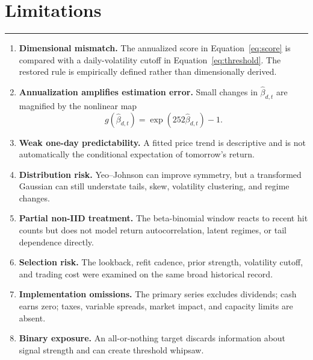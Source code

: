 \documentclass[11pt,a4paper]{article}
\newcommand{\sectionrule}{\vspace{-0.5em}\par\noindent\color{SignalGreen}\rule{\linewidth}{0.7pt}\color{Ink}\par\vspace{0.3em}}
\begin{document}
\section{Limitations}
\sectionrule
\begin{enumerate}
\item \textbf{Dimensional mismatch.} The annualized score in Equation~\ref{eq:score} is compared with a daily-volatility cutoff in Equation~\ref{eq:threshold}. The restored rule is empirically defined rather than dimensionally derived.
\item \textbf{Annualization amplifies estimation error.} Small changes in $\widehat{\beta}_{d,t}$ are magnified by the nonlinear map
\[
g(\widehat{\beta}_{d,t})=\exp(252\widehat{\beta}_{d,t})-1.
\]
\item \textbf{Weak one-day predictability.} A fitted price trend is descriptive and is not automatically the conditional expectation of tomorrow's return.
\item \textbf{Distribution risk.} Yeo--Johnson can improve symmetry, but a transformed Gaussian can still understate tails, skew, volatility clustering, and regime changes.
\item \textbf{Partial non-IID treatment.} The beta-binomial window reacts to recent hit counts but does not model return autocorrelation, latent regimes, or tail dependence directly.
\item \textbf{Selection risk.} The lookback, refit cadence, prior strength, volatility cutoff, and trading cost were examined on the same broad historical record.
\item \textbf{Implementation omissions.} The primary series excludes dividends; cash earns zero; taxes, variable spreads, market impact, and capacity limits are absent.
\item \textbf{Binary exposure.} An all-or-nothing target discards information about signal strength and can create threshold whipsaw.
\end{enumerate}
\end{document}
